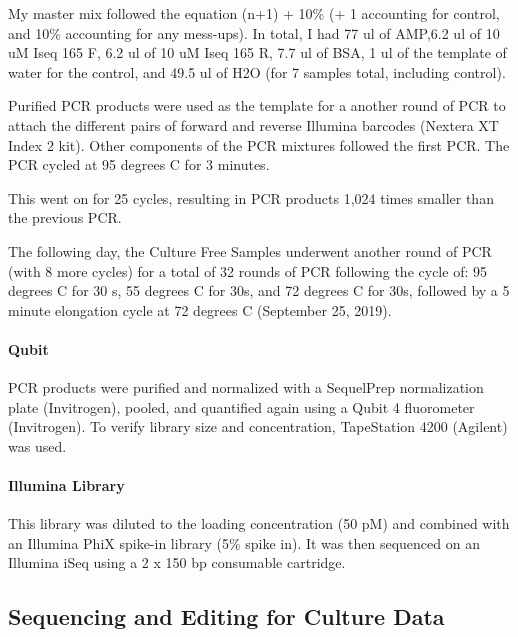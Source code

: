 \documentclass[]{article}
\let\oldparagraph\paragraph
\renewcommand{\paragraph}[1]{\oldparagraph{#1}\mbox{}}
\begin{document}
My master mix followed the equation (n+1) + 10\% (+ 1 accounting for
control, and 10\% accounting for any mess-ups). In total, I had 77 ul of
AMP,6.2 ul of 10 uM Iseq 165 F, 6.2 ul of 10 uM Iseq 165 R, 7.7 ul of
BSA, 1 ul of the template of water for the control, and 49.5 ul of H2O
(for 7 samples total, including control).

Purified PCR products were used as the template for a another round of
PCR to attach the different pairs of forward and reverse Illumina
barcodes (Nextera XT Index 2 kit). Other components of the PCR mixtures
followed the first PCR. The PCR cycled at 95 degrees C for 3 minutes.

This went on for 25 cycles, resulting in PCR products 1,024 times
smaller than the previous PCR.

The following day, the Culture Free Samples underwent another round of
PCR (with 8 more cycles) for a total of 32 rounds of PCR following the
cycle of: 95 degrees C for 30 s, 55 degrees C for 30s, and 72 degrees C
for 30s, followed by a 5 minute elongation cycle at 72 degrees C
(September 25, 2019).

\hypertarget{qubit}{%
\paragraph{Qubit}\label{qubit}}

PCR products were purified and normalized with a SequelPrep
normalization plate (Invitrogen), pooled, and quantified again using a
Qubit 4 fluorometer (Invitrogen). To verify library size and
concentration, TapeStation 4200 (Agilent) was used.

\hypertarget{illumina-library}{%
\paragraph{Illumina Library}\label{illumina-library}}

This library was diluted to the loading concentration (50 pM) and
combined with an Illumina PhiX spike-in library (5\% spike in). It was
then sequenced on an Illumina iSeq using a 2 x 150 bp consumable
cartridge.

\hypertarget{sequencing-and-editing-for-culture-data}{%
\subsection{Sequencing and Editing for Culture
Data}\label{sequencing-and-editing-for-culture-data}}
\end{document}
